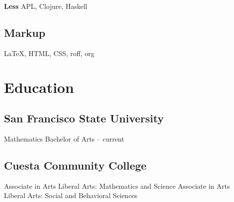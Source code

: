 {\bfseries Less} APL, Clojure, Haskell
\subsection{Markup}
{\LaTeX}, HTML, CSS, roff, org

\section{Education}
\subsection{San Francisco State University}
Mathematics Bachelor of Arts -- current
\subsection{Cuesta Community College}
Associate in Arts
Liberal Arts: Mathematics and Science
Associate in Arts
Liberal Arts: Social and Behavioral Sciences




